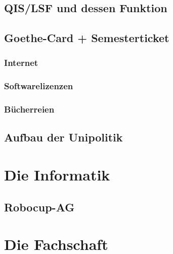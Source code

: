 \documentclass[12pt,a4paper]{scrartcl}
\begin{document}
	\subsection{QIS/LSF und dessen Funktion}
	\newpage
		\subsection{Goethe-Card + Semesterticket}
		
		
		\subsubsection{Internet}
		\subsubsection{Softwarelizenzen}
		\subsubsection{Bücherreien}
	\subsection{Aufbau der Unipolitik}
\newpage
\section{Die Informatik}
	\subsection{Robocup-AG}
    

\label{fachschaftsarbeit}
\section{Die Fachschaft}
    

	
	
\end{document}

